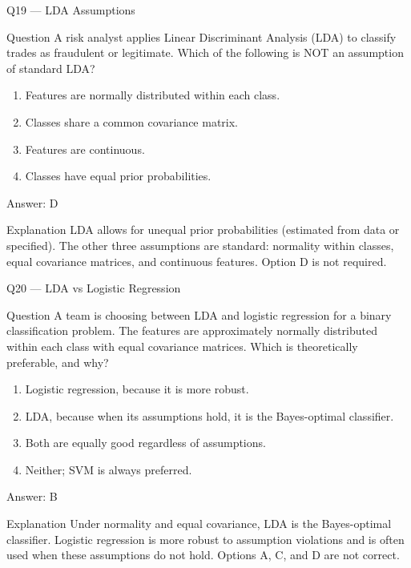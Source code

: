\documentclass[aspectratio=169,8pt]{beamer}
\begin{document}
	\begin{frame}{Q19 --- LDA Assumptions}
		\begin{block}{Question}
			A risk analyst applies Linear Discriminant Analysis (LDA) to classify trades as fraudulent or legitimate. Which of the following is NOT an assumption of standard LDA?
			\begin{enumerate}
				\item Features are normally distributed within each class.
				\item Classes share a common covariance matrix.
				\item Features are continuous.
				\item Classes have equal prior probabilities.
			\end{enumerate}
		\end{block}
		\begin{exampleblock}{Answer: D}\end{exampleblock}
		\begin{block}{Explanation}
			LDA allows for unequal prior probabilities (estimated from data or specified). The other three assumptions are standard: normality within classes, equal covariance matrices, and continuous features. Option D is not required.
		\end{block}
	\end{frame}
	
	\begin{frame}{Q20 --- LDA vs Logistic Regression}
		\begin{block}{Question}
			A team is choosing between LDA and logistic regression for a binary classification problem. The features are approximately normally distributed within each class with equal covariance matrices. Which is theoretically preferable, and why?
			\begin{enumerate}
				\item Logistic regression, because it is more robust.
				\item LDA, because when its assumptions hold, it is the Bayes-optimal classifier.
				\item Both are equally good regardless of assumptions.
				\item Neither; SVM is always preferred.
			\end{enumerate}
		\end{block}
		\begin{exampleblock}{Answer: B}\end{exampleblock}
		\begin{block}{Explanation}
			Under normality and equal covariance, LDA is the Bayes-optimal classifier. Logistic regression is more robust to assumption violations and is often used when these assumptions do not hold. Options A, C, and D are not correct.
		\end{block}
	\end{frame}
	
\end{document}
